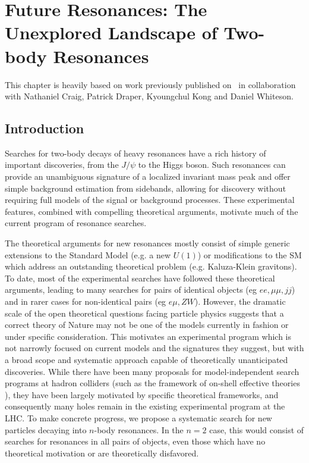 
\chapter{Future Resonances: The Unexplored Landscape of Two-body Resonances}

This chapter is heavily based on work previously published on~\cite{craig2016unexplored} in collaboration with Nathaniel Craig, Patrick Draper, Kyoungchul Kong and Daniel Whiteson.


\newcommand{\none}{\emptyset}
\newcommand{\bnum}[2]{(\mathbf{#1}, #2)}
\newcommand{\fnum}[2]{[\mathbf{#1}, #2]}

\section{Introduction}

Searches for two-body decays of heavy resonances have a rich history of important discoveries, from the $J/\psi$ to the Higgs boson.  Such resonances can provide an unambiguous signature of a localized invariant mass peak and offer simple background estimation from sidebands, allowing for discovery without requiring full models of the signal or background processes.  These experimental features, combined with compelling theoretical arguments, motivate much of the current program of resonance searches.

The theoretical arguments for new resonances mostly consist of simple generic extensions to the Standard Model (e.g. a new $U(1)$) or modifications to the SM which address an outstanding theoretical problem (e.g. Kaluza-Klein gravitons).  To date, most of the experimental searches have followed these theoretical arguments, leading to many searches for pairs of identical objects (eg $ee,\mu\mu, jj$) and in rarer cases for non-identical pairs (eg $e\mu,ZW$).   However,  the dramatic scale of the open theoretical  questions facing particle physics suggests that a correct theory of Nature may not be one of the models currently in fashion or under specific consideration.   This motivates an experimental program which is not narrowly focused on current models and the signatures they suggest, but with a broad scope and systematic approach capable of theoretically unanticipated discoveries. While there have been many proposals for model-independent search programs at hadron colliders (such as the framework of on-shell effective theories \cite{ArkaniHamed:2007fw}), they have been largely motivated by specific theoretical frameworks, and consequently many holes remain in the existing experimental program at the LHC. To make concrete progress, we propose a systematic search for new particles decaying into $n$-body resonances. In the $n=2$ case, this would consist of searches for resonances in all pairs of objects, even those which have no theoretical motivation or are theoretically disfavored.

